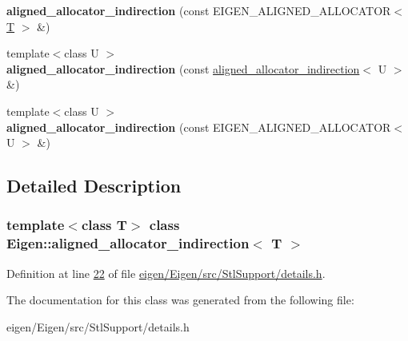 \begin{DoxyCompactItemize}
{\bfseries aligned\+\_\+allocator\+\_\+indirection} (const E\+I\+G\+E\+N\+\_\+\+A\+L\+I\+G\+N\+E\+D\+\_\+\+A\+L\+L\+O\+C\+A\+T\+OR$<$ \hyperlink{group___sparse_core___module}{T} $>$ \&)
\item 
\mbox{\label{class_eigen_1_1aligned__allocator__indirection_a1e6768d759dca2902bfaac420f145b37}} 
{\footnotesize template$<$class U $>$ }\\{\bfseries aligned\+\_\+allocator\+\_\+indirection} (const \hyperlink{class_eigen_1_1aligned__allocator__indirection}{aligned\+\_\+allocator\+\_\+indirection}$<$ U $>$ \&)
\item 
\mbox{\label{class_eigen_1_1aligned__allocator__indirection_aa47167e9b3924f7e05e4171685b6998e}} 
{\footnotesize template$<$class U $>$ }\\{\bfseries aligned\+\_\+allocator\+\_\+indirection} (const E\+I\+G\+E\+N\+\_\+\+A\+L\+I\+G\+N\+E\+D\+\_\+\+A\+L\+L\+O\+C\+A\+T\+OR$<$ U $>$ \&)
\end{DoxyCompactItemize}


\subsection{Detailed Description}
\subsubsection*{template$<$class T$>$\newline
class Eigen\+::aligned\+\_\+allocator\+\_\+indirection$<$ T $>$}



Definition at line \hyperlink{eigen_2_eigen_2src_2_stl_support_2details_8h_source_l00022}{22} of file \hyperlink{eigen_2_eigen_2src_2_stl_support_2details_8h_source}{eigen/\+Eigen/src/\+Stl\+Support/details.\+h}.



The documentation for this class was generated from the following file\+:\begin{DoxyCompactItemize}
\item 
eigen/\+Eigen/src/\+Stl\+Support/details.\+h\end{DoxyCompactItemize}
